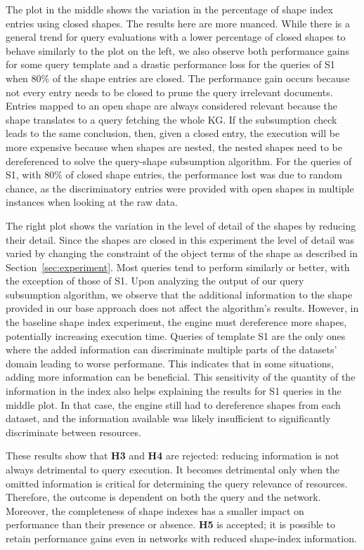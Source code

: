 The plot in the middle shows the variation in the percentage of shape index entries using closed shapes.
The results here are more nuanced.
While there is a general trend for query evaluations with a lower percentage of closed shapes to behave similarly to the plot on the left, we also observe both performance gains for some query template and a drastic performance loss for the queries of S1 when 80\% of the shape entries are closed.
The performance gain occurs because not every entry needs to be closed to prune the query irrelevant documents.
Entries mapped to an open shape are always considered relevant because the shape translates to a query fetching the whole KG.
If the subsumption check leads to the same conclusion, then, given a closed entry, the execution will be more expensive because 
when shapes are nested, the nested shapes need to be dereferenced to solve the query-shape subsumption algorithm.
For the queries of S1, with 80\% of closed shape entries, the performance lost was due to random chance, as the discriminatory entries were provided with open shapes in multiple instances when looking at the raw data.

The right plot shows the variation in the level of detail of the shapes by reducing their detail.
Since the shapes are closed in this experiment the level of detail was varied by changing the constraint of the object terms of the shape as described in Section~\ref{sec:experiment}.
Most queries tend to perform similarly or better, with the exception of those of S1.
Upon analyzing the output of our query subsumption algorithm, we observe that the additional information to the shape provided in our base approach does not affect the algorithm’s results.
However, in the baseline shape index experiment, the engine must dereference more shapes, potentially increasing execution time.
Queries of template S1 are the only ones where the added information can discriminate multiple parts of the datasets' domain leading to worse performane.
This indicates that in some situations, adding more information can be beneficial.
This sensitivity of the quantity of the information in the index also helps explaining the results for S1 queries in the middle plot. 
In that case, the engine still had to dereference shapes from each dataset, and the information available was likely insufficient to significantly discriminate between resources.

These results show that \textbf{H3} and \textbf{H4} are rejected: reducing information is not always detrimental to query execution.
It becomes detrimental only when the omitted information is critical for determining the query relevance of resources. 
Therefore, the outcome is dependent on both the query and the network. 
Moreover, the completeness of shape indexes has a smaller impact on performance than their presence or absence.
\textbf{H5} is accepted; it is possible to retain performance gains even in networks with reduced shape-index information.


